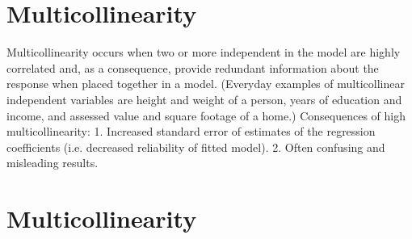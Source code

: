 \documentclass[]{report}
\begin{document}
\section*{Multicollinearity}
Multicollinearity occurs when two or more independent in the model are highly correlated and, as a consequence,
provide redundant information about the response when placed together in a model. (Everyday examples of
multicollinear independent variables are height and weight of a person, years of education and income, and
assessed value and square footage of a home.)
Consequences of high multicollinearity:
1. Increased standard error of estimates of the regression coefficients (i.e. decreased reliability of fitted
model).
2. Often confusing and misleading results.

\section*{Multicollinearity}
\end{document}
